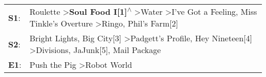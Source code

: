 \begin{supertabular}{p{0.03\textwidth}p{0.92\textwidth}}
 \textbf{S1}:  &  Roulette\textsuperscript{} \textgreater \enspace \textbf{Soul Food I[1]\textsuperscript{$\wedge$}} \textgreater \enspace Water\textsuperscript{} \textgreater \enspace I've Got a Feeling\textsuperscript{}, \enspace Miss Tinkle's Overture\textsuperscript{} \textgreater \enspace Ringo\textsuperscript{}, \enspace Phil's Farm[2]\textsuperscript{}  \enspace  \\
 \textbf{S2}:  &                                                                      Bright Lights, Big City[3]\textsuperscript{} \textgreater \enspace Padgett's Profile\textsuperscript{}, \enspace Hey Nineteen[4]\textsuperscript{} \textgreater \enspace Divisions\textsuperscript{}, \enspace JaJunk[5]\textsuperscript{}, \enspace Mail Package\textsuperscript{}  \enspace  \\
 \textbf{E1}:  &                                                                                                                                                                                                                                                                       Push the Pig\textsuperscript{} \textgreater \enspace Robot World\textsuperscript{}  \enspace  \\
\end{supertabular}

